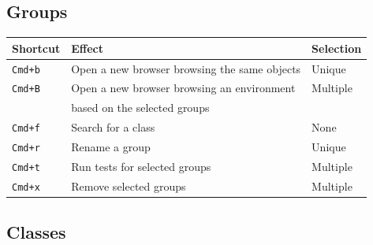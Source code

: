 \documentclass[a4paper,10pt,twoside]{book}
\begin{document}
\subsection{Groups}


\begin{tabular}{l | l | l}
Shortcut & Effect & Selection\\
\hline
\hline
\verb?Cmd+b? & Open a new browser browsing the same objects & Unique\\
\hline
\verb?Cmd+B?& Open a new browser browsing an environment & Multiple\\
 &based on the selected groups & \\
\hline
\verb?Cmd+f? &  Search for a class& None\\
\hline
\verb?Cmd+r? & Rename a group&Unique\\
\hline
\verb?Cmd+t? & Run tests for selected groups&Multiple\\
\hline
\verb?Cmd+x? & Remove selected groups&Multiple\\
\hline
\end{tabular}

\subsection{Classes}

\end{document}
